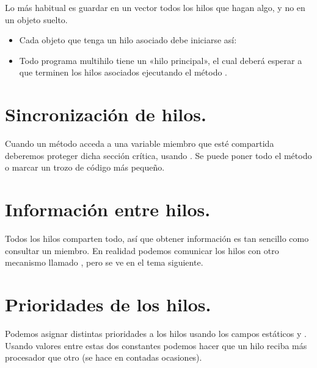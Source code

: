 \documentclass[letterpaper,10pt,spanish]{sphinxmanual}
\begin{document}
\begin{sphinxVerbatim}[commandchars=\\\{\}]
  
\end{sphinxVerbatim}

Lo más habitual es guardar en un vector todos los hilos que hagan algo, y no en un objeto suelto.
\begin{itemize}
\item {} 
Cada objeto que tenga un hilo asociado debe iniciarse así:

\end{itemize}

\begin{sphinxVerbatim}[commandchars=\\\{\}]
\end{sphinxVerbatim}
\begin{itemize}
\item {} 
Todo programa multihilo tiene un «hilo principal», el cual deberá esperar a que terminen los hilos asociados ejecutando el método   .

\end{itemize}


\section{Sincronización de hilos.}
\label{\detokenize{textos/tema2:sincronizacion-de-hilos}}
Cuando un método acceda a una variable miembro que esté compartida deberemos proteger dicha sección crítica, usando . Se puede poner todo el método  o marcar un trozo de código más pequeño.


\section{Información entre hilos.}
\label{\detokenize{textos/tema2:informacion-entre-hilos}}
Todos los hilos comparten todo, así que obtener información es tan sencillo como consultar un miembro.
En realidad podemos comunicar los hilos con otro mecanismo llamado , pero se ve en el tema siguiente.


\section{Prioridades de los hilos.}
\label{\detokenize{textos/tema2:prioridades-de-los-hilos}}
Podemos asignar distintas prioridades a los hilos usando los campos estáticos  y . Usando valores entre estas dos constantes podemos hacer que un hilo reciba más procesador que otro (se hace en contadas ocasiones).
\end{document}
